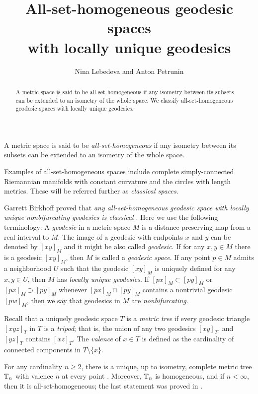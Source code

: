 \documentclass[leqno,a4paper,10pt]{article}
\def\theauthors{Nina Lebedeva and Anton Petrunin}
\begin{document}
\title{All-set-homogeneous geodesic spaces\\with locally unique geodesics}
\author{\theauthors}
\date{}
\maketitle

\begin{abstract}
A metric space is said to be all-set-homogeneous if any isometry between its subsets can be extended to an isometry of the whole space.
We classify all-set-homogeneous geodesic spaces with locally unique geodesics.
\end{abstract}


A metric space is said to be \emph{all-set-homogeneous}
if any isometry between its subsets can be extended to an isometry of the whole space.

Examples of all-set-homogeneous spaces include complete simply-connected Riemannian manifolds with constant curvature and the circles with length metrics.
These will be referred further as \emph{classical spaces}.

Garrett Birkhoff proved that \emph{any all-set-homogeneous geodesic space with locally unique nonbifurcating geodesics is classical} \cite{birkhoff}.
Here we use the following terminology:
A \emph{geodesic} in a metric space $M$ is a distance-preserving map from a real interval to $M$.
The image of a geodesic with endpoints $x$ and $y$ can be denoted by $[xy]_M$ and it might be also called \emph{geodesic}.
If for any $x,y\in M$ there is a geodesic $[xy]_M$, then $M$ is called a \emph{geodesic space}.
If any point $p\in M$ admits a neighborhood $U$ such that the geodesic $[xy]_M$ is uniquely defined for any $x,y\in U$, then $M$ has \emph{locally unique geodesics}.
If $[px]_M\subset [py]_M$ or $[px]_M\supset [py]_M$ whenever $[px]_M\cap [py]_M$ contains a nontrivial geodesic $[pw]_M$, then we say that geodesics in $M$ are \emph{nonbifurcating}.

Recall that a uniquely geodesic space $T$ is a \emph{metric tree} if every geodesic triangle $[xyz]_T$ in $T$ is a \emph{tripod};
that is, the union of any two geodesics $[xy]_T$, and $[yz]_T$ contains $[xz]_T$.
The \emph{valence} of $x\in T$ is defined as the cardinality of connected components in $T\setminus \{x\}$.

For any cardinality $n\ge2$, there is a unique, up to isometry,
complete metric tree $\mathbb{T}_n$ with valence $n$ at every point \cite{dyubina-polterovich}.
Moreover, $\mathbb{T}_n$ is homogeneous, and if $n<\infty$, then it is all-set-homogeneous; the last statement was proved in \cite{lebedeva-petrunin2024}.
\end{document}
